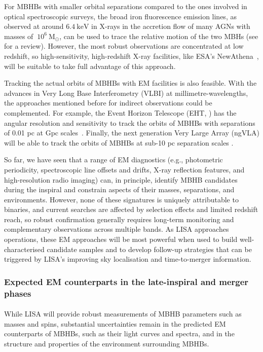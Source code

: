 \documentclass[a4paper,12pt]{article}
\begin{document}
For MBHBs with smaller orbital separations compared to the ones involved in optical spectroscopic surveys, the broad iron fluorescence emission lines, as observed at around $6.4~\text{keV}$ in X-rays in the accretion flow of many AGNs with masses of $~10^{6}~\mathrm{M}_{\odot}$, can be used to trace the relative motion of the two MBHs (see \cite{reynolds2015measuring} for a review). However, the most robust observations are concentrated at low redshift\cite{severgnini2018swift,mckernan2015detection}, so high-sensitivity, high-redshift X-ray facilities,  like ESA's NewAthena~\cite{cruise2025newathena}, will be suitable to take full advantage of this approach.  

Tracking the actual orbits of MBHBs with EM facilities is also feasible. With the advances in Very Long Base Interferometry (VLBI) at millimetre-wavelengths, the approaches mentioned before for indirect observations could be complemented. For example, the Event Horizon Telescope (EHT, \cite{akiyama2019first}) has the angular resolution and sensitivity to track the orbits of MBHBs with separations of 0.01 pc at Gpc scales~\cite{amaro2023astrophysics}. Finally, the next generation Very Large Array (ngVLA) will be able to track the orbits of MBHBs at sub-10 pc separation scales \cite{burke2018next}.

So far, we have seen that a range of EM diagnostics (e.g., photometric periodicity, spectroscopic line offsets and drifts, X-ray reflection features, and high-resolution radio imaging) can, in principle, identify MBHB candidates during the inspiral and constrain aspects of their masses, separations, and environments. However, none of these signatures is uniquely attributable to binaries, and current searches are affected by selection effects and limited redshift reach, so robust confirmation generally requires long-term monitoring and complementary observations across multiple bands. As LISA approaches operations, these EM approaches will be most powerful when used to build well-characterised candidate samples and to develop follow-up strategies that can be triggered by LISA’s improving sky localisation and time-to-merger information\cite{mangiagli2022massive,bogdanovic2022electromagnetic}.

\subsubsection{Expected EM counterparts in the late-inspiral and merger phases}

\paragraph{}
While LISA will provide robust measurements of MBHB parameters such as masses and spins, substantial uncertainties remain in the predicted EM counterparts of MBHBs, such as their light curves and spectra, and in the structure and properties of the environment surrounding MBHBs\cite{mangiagli2022massive,bogdanovic2022electromagnetic}.
\end{document}
